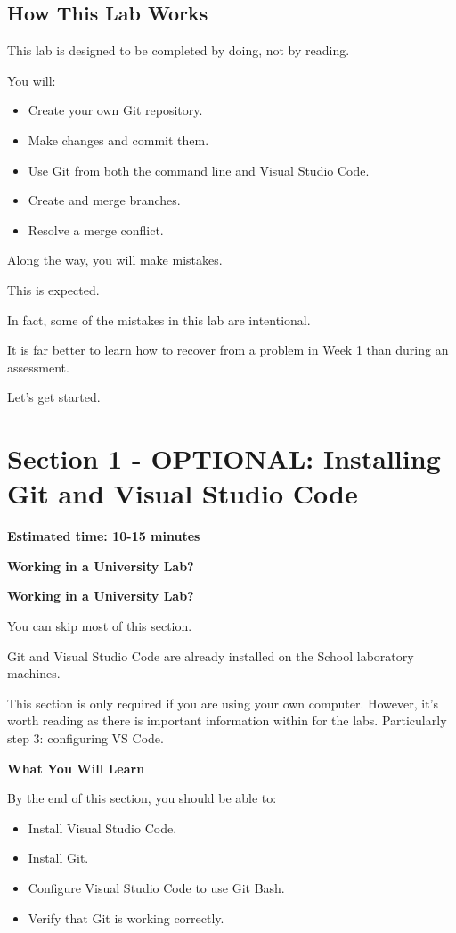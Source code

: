 \documentclass{csc2059practical}
\begin{document}
\subsection{How This Lab Works}
This lab is designed to be completed by doing, not by reading.

You will:

\begin{itemize}
  \item Create your own Git repository.
  \item Make changes and commit them.
  \item Use Git from both the command line and Visual Studio Code.
  \item Create and merge branches.
  \item Resolve a merge conflict.
\end{itemize}
Along the way, you will make mistakes.

This is expected.

In fact, some of the mistakes in this lab are intentional.

It is far better to learn how to recover from a problem in Week 1 than during an assessment.

Let's get started.


\clearpage
\section{Section 1 - OPTIONAL: Installing Git and Visual Studio Code}
\begin{infobox}
\textbf{Estimated time: 10-15 minutes}
\end{infobox}
\begin{importantnote}
\textbf{Working in a University Lab?}\par
\medskip
\textbf{Working in a University Lab?}


You can skip most of this section.


Git and Visual Studio Code are already installed on the School laboratory machines.


This section is only required if you are using your own computer. However, it's worth reading as there is important information within for the labs. Particularly step 3: configuring VS Code.


\end{importantnote}
\begin{learningoutcomes}
\textbf{What You Will Learn}\par
\medskip
By the end of this section, you should be able to:

\begin{itemize}
  \item Install Visual Studio Code.
  \item Install Git.
  \item Configure Visual Studio Code to use Git Bash.
  \item Verify that Git is working correctly.
\end{itemize}
\end{learningoutcomes}
\end{document}
